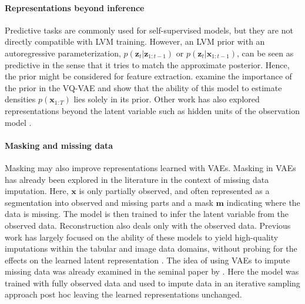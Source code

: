 \paragraph{Representations beyond inference} Predictive tasks are commonly used for self-supervised models, but they are not directly compatible with LVM training. 
However, an LVM prior with an autoregressive parameterization, $p(\mathbf{z}_t|\mathbf{z}_{1:t-1})$ or $p(\mathbf{z}_t|\mathbf{x}_{1:t-1})$, can be seen as predictive in the sense that it tries to match the approximate posterior.
Hence, the prior might be considered for feature extraction.
\citet{jones2020discrete} examine the importance of the prior in the VQ-VAE and show that the ability of this model to estimate densities $p(\mathbf{x}_{1:T})$ lies solely in its prior. Other work has also explored representations beyond the latent variable such as hidden units of the observation model \cite{khurana_convolutional_2020, chorowski_unsupervised_2019}.


\paragraph{Masking and missing data}
Masking may also improve representations learned with VAEs. 
Masking in VAEs has already been explored in the literature in the context of missing data imputation. Here, $\mathbf{x}$ is only partially observed, and often represented as a segmentation into observed and missing parts and a mask $\mathbf{m}$ indicating where the data is missing. The model is then trained to infer the latent variable from the observed data. Reconstruction also deals only with the observed data. Previous work has largely focused on the ability of these models to yield high-quality imputations within the tabular and image data domains, without probing for the effects on the learned latent representation \cite{mattei_miwae_2019, ipsen_not-miwae_2021}. 
The idea of using VAEs to impute missing data was already examined in the seminal paper by \citet{rezende_stochastic_2014}. Here the model was trained with fully observed data and used to impute data in an iterative sampling approach post hoc leaving the learned representations unchanged.


